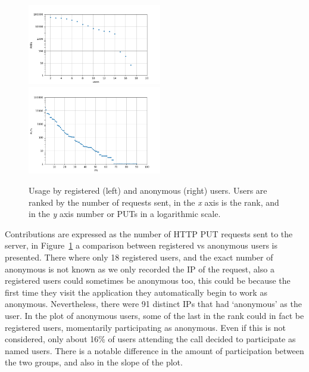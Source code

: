 \documentclass{llncs}
\begin{document}
\begin{figure}[h!tbp]
    \centering
        \includegraphics[width=2.3in]{img/puts_user.png}
        \includegraphics[width=2.3in]{img/puts_ip.png}
    \caption{Usage by registered (left) and anonymous (right) users.  Users are ranked by
        the number of requests sent, in the \emph{x} axis is the rank, and in the \emph{y} axis 
        number or PUTs in a logarithmic scale.}
    \label{fig:puts}
\end{figure}
%
Contributions are expressed as the number of HTTP PUT requests sent to the server, 
in Figure~\ref{fig:puts} a comparison between registered vs anonymous users is 
presented. There where only 18 registered users, and the exact number of anonymous
is not known as we only recorded the IP of the request, also a registered users 
could sometimes be anonymous too, this could be because the first time they visit
the application they automatically begin to work as anonymous. Nevertheless,
there were 91 distinct IPs that had `anonymous' as the user. In the plot of
anonymous users, some of the last in the rank could in fact be registered users, 
momentarily participating as anonymous. Even if this is not considered, only 
about 16\% of users attending the call decided to participate as named users. 
There is a notable difference in the amount of participation between the two
groups, and also in the slope of the plot.
\end{document}
